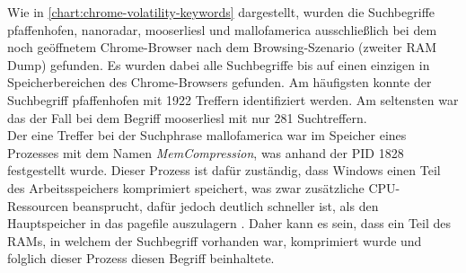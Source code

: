 Wie in \autoref{chart:chrome-volatility-keywords} dargestellt, wurden die Suchbegriffe \glqq{}pfaffenhofen\grqq{}, \glqq{}nanoradar\grqq{}, \glqq{}mooserliesl\grqq{} und \glqq{}mallofamerica\grqq{} ausschließlich bei dem noch geöffnetem Chrome-Browser nach dem Browsing-Szenario (zweiter RAM Dump) gefunden. Es wurden dabei alle Suchbegriffe bis auf einen einzigen in Speicherbereichen des Chrome-Browsers gefunden. Am häufigsten konnte der Suchbegriff \glqq{}pfaffenhofen\grqq{} mit 1922 Treffern identifiziert werden. Am seltensten war das der Fall bei dem Begriff \glqq{}mooserliesl\grqq{} mit nur 281 Suchtreffern. \\
Der eine Treffer bei der Suchphrase \glqq{}mallofamerica\grqq{} war im Speicher eines Prozesses mit dem Namen \textit{MemCompression}, was anhand der PID 1828 festgestellt wurde. Dieser Prozess ist dafür zuständig, dass Windows einen Teil des Arbeitsspeichers komprimiert speichert, was zwar zusätzliche CPU-Ressourcen beansprucht, dafür jedoch deutlich schneller ist, als den Hauptspeicher in das pagefile auszulagern \cite{MemCompressionWebsite}. Daher kann es sein, dass ein Teil des RAMs, in welchem der Suchbegriff vorhanden war, komprimiert wurde und folglich dieser Prozess diesen Begriff beinhaltete.

